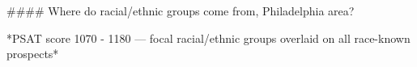 #### Where do racial/ethnic groups come from, Philadelphia area?

*PSAT score 1070 - 1180 — focal racial/ethnic groups overlaid on all race-known prospects*
